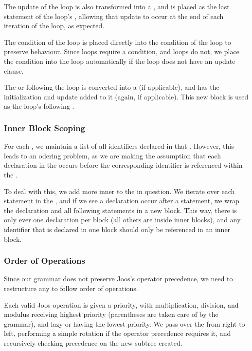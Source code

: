 \documentclass[pdftex,11pt,a4paper]{article}
\begin{document}
The update of the  loop is also transformed into a ,
and is placed as the last statement of the  loop's ,
allowing that update to occur at the end of each iteration of the loop, as
expected.

The condition of the  loop is placed directly into the condition of
the  loop to preserve behaviour. Since  loops require a
condition, and  loops do not, we place the  condition into
the  loop automatically if the  loop does not have an
update clause.

The  or  following the  loop is converted
into a  (if applicable), and has the initialization and update
added to it (again, if applicable). This new block is used as the 
loop's following .

\subsubsection{Inner Block Scoping}

For each , we maintain a list of all identifiers declared in
that . However, this leads to an odering problem, as we are making
the assumption that each declaration in the  occurs before the
corresponding identifier is referenced within the .

To deal with this, we add more inner  to the  in
question. We iterate over each statement in the , and if we see a
declaration occur after a statement, we wrap the declaration and all following
statements in a new block. This way, there is only ever one declaration per
block (all others are inside inner blocks), and any identifier that is
declared in one block should only be referenced in an inner block.

\subsubsection{Order of Operations}

Since our grammar does not preserve Joos's operator precedence, we need to
restructure any  to follow order of operations.

Each valid Joos operation is given a priority, with multiplication, division,
and modulus receiving highest priority (parentheses are taken care of by the
grammar), and lazy-or having the lowest priority. We pass over the
 from right to left, performing a simple rotation if
the operator precedence requires it, and recursively checking precedence on the
new subtree created.
\end{document}
